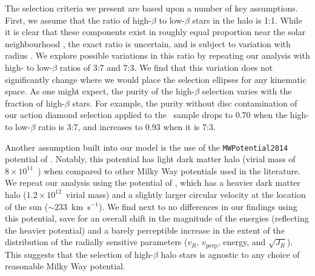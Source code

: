 The selection criteria we present are based upon a number of key assumptions. First, we assume that the ratio of high-$\beta$ to low-$\beta$ stars in the halo is 1:1. While it is clear that these components exist in roughly equal proportion near the solar neighbourhood \citep{belokurov18,lancaster19,iorio21}, the exact ratio is uncertain, and is subject to variation with radius \citep{iorio21}. We explore possible variations in this ratio by repeating our analysis with high- to low-$\beta$ ratios of 3:7 and 7:3. We find that this variation does not significantly change where we would place the selection ellipses for any kinematic space. As one might expect, the purity of the high-$\beta$ selection varies with the fraction of high-$\beta$ stars. For example, the purity without disc contamination of our action diamond selection applied to the \survey\ sample drops to 0.70 when the high- to low-$\beta$ ratio is 3:7, and increases to 0.93 when it is 7:3.

Another assumption built into our model is the use of the \texttt{MWPotential2014} potential of \citet{bovy14}. Notably, this potential has light dark matter halo (virial mass of $8\times10^{11}$~\Msun) when compared to other Milky Way potentials used in the literature. We repeat our analysis using the potential of \citet{mcmillan17}, which has a heavier dark matter halo ($1.2\times10^{12}$~\Msun virial mass) and a slightly larger circular velocity at the location of the sun ($\sim 233$~km~s$^{-1}$). We find next to no differences in our findings using this potential, save for an overall shift in the magnitude of the energies (reflecting the heavier potential) and a barely perceptible increase in the extent of the distribution of the radially sensitive parameters ($v_{R}$, $v_{\mathrm{perp}}$, energy, and $\sqrt{J_{R}}$). This suggests that the selection of high-$\beta$ halo stars is agnostic to any choice of reasonable Milky Way potential.


